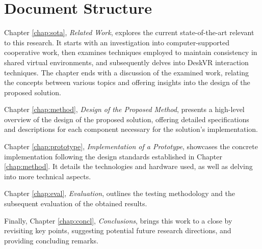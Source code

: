\section{Document Structure}

Chapter \ref{chap:sota}, \textit{Related Work}, explores the current state-of-the-art relevant to this research. It starts with an investigation into computer-supported cooperative work, then examines techniques employed to maintain consistency in shared virtual environments, and subsequently delves into DeskVR interaction techniques. The chapter ends with a discussion of the examined work, relating the concepts between various topics and offering insights into the design of the proposed solution.

Chapter \ref{chap:method}, \textit{Design of the Proposed Method}, presents a high-level overview of the design of the proposed solution, offering detailed specifications and descriptions for each component necessary for the solution's implementation.

Chapter \ref{chap:prototype}, \textit{Implementation of a Prototype}, showcases the concrete implementation following the design standards established in Chapter \ref{chap:method}. It details the technologies and hardware used, as well as delving into more technical aspects.

Chapter \ref{chap:eval}, \textit{Evaluation}, outlines the testing methodology and the subsequent evaluation of the obtained results.

Finally, Chapter \ref{chap:concl}, \textit{Conclusions}, brings this work to a close by revisiting key points, suggesting potential future research directions, and providing concluding remarks.

